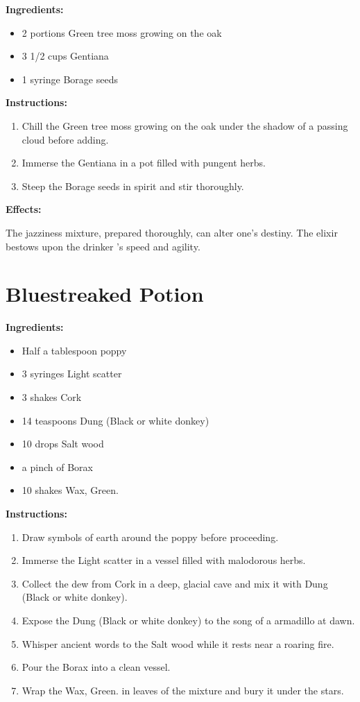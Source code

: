 \documentclass{article}
\begin{document}
\textbf{Ingredients:}

\begin{itemize}
  \item 2 portions Green tree moss growing on the oak
  \item 3 1/2 cups Gentiana
  \item 1 syringe Borage seeds
\end{itemize}

\textbf{Instructions:}

\begin{enumerate}
  \item Chill the Green tree moss growing on the oak under the shadow of a passing cloud before adding.
  \item Immerse the Gentiana in a pot filled with pungent herbs.
  \item Steep the Borage seeds in spirit and stir thoroughly.
\end{enumerate}

\textbf{Effects:}

The jazziness mixture, prepared thoroughly, can alter one's destiny. The elixir bestows upon the drinker 's speed and agility.

\newpage
\section*{Bluestreaked Potion}

\textbf{Ingredients:}

\begin{itemize}
  \item Half a tablespoon poppy
  \item 3 syringes Light scatter
  \item 3 shakes Cork
  \item 14 teaspoons Dung (Black or white donkey)
  \item 10 drops Salt wood
  \item a pinch of Borax
  \item 10 shakes Wax, Green.
\end{itemize}

\textbf{Instructions:}

\begin{enumerate}
  \item Draw symbols of earth around the poppy before proceeding.
  \item Immerse the Light scatter in a vessel filled with malodorous herbs.
  \item Collect the dew from Cork in a deep, glacial cave and mix it with Dung (Black or white donkey).
  \item Expose the Dung (Black or white donkey) to the song of a armadillo at dawn.
  \item Whisper ancient words to the Salt wood while it rests near a roaring fire.
  \item Pour the Borax into a clean vessel.
  \item Wrap the Wax, Green. in leaves of the mixture and bury it under the stars.
\end{enumerate}
\end{document}
